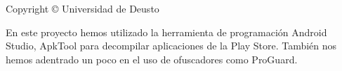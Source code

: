 \thispagestyle{empty}
{\small
\strut\vfill %
\noindent Copyright \copyright{} Universidad de Deusto\par
\vspace{0.2cm}
\noindent En este proyecto hemos utilizado la herramienta de programación Android Studio, ApkTool para decompilar aplicaciones de la Play Store. También nos hemos adentrado un poco en el uso de ofuscadores como ProGuard.
}
\clearpage

